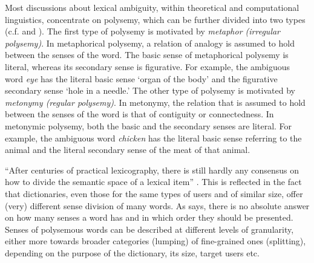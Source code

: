 \documentclass[11pt]{article}
\begin{document}
Most discussions about lexical ambiguity, within theoretical and computational
linguistics, concentrate on polysemy, which can be further divided into two
types (c.f. \cite{apr:1974} and \cite{pus:19995}). The first type of polysemy is motivated by
\emph{metaphor (irregular polysemy)}. In metaphorical polysemy, a relation of analogy is assumed to
hold between the senses of the word. The basic sense of metaphorical polysemy
is literal, whereas its secondary sense is figurative. For example, the
ambiguous word \emph{eye} has the literal basic sense  `organ of the body' and
the figurative secondary sense `hole in a needle.' The other type of polysemy
is motivated by \emph{metonymy (regular polysemy)}. In metonymy, the relation that is assumed to
hold between the senses of the word is that of contiguity or connectedness.
In metonymic polysemy, both the basic and the secondary senses are literal. For
example, the ambiguous word \emph{chicken} has the literal basic sense
referring to the animal and the literal secondary sense of the meat of that
animal. 


``After centuries of practical lexicography, there is still hardly any
consensus on how to divide the semantic space of a lexical item''
\citep{mee:2006}. This is reflected in the fact that dictionaries, even those for
the same types of users and of similar size, offer (very) different sense
division of many words. As \citet{moo:1987} says, there is no absolute answer on
how many senses a word has and in which order they should be presented. Senses
of polysemous words can be described at different levels of granularity, either
more towards broader categories (lumping) of fine-grained ones (splitting),
depending on the purpose of the dictionary, its size, target users etc.
\end{document}
